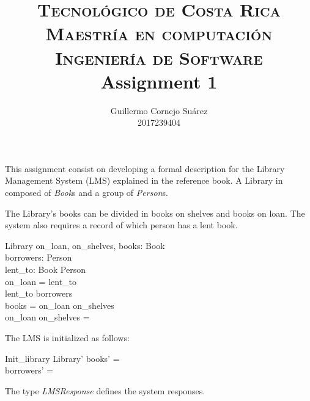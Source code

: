 \documentclass[11pt, fuzz]{article}
\title{		
		\usefont{OT1}{bch}{b}{n}
        \Large \textsc{Tecnológico de Costa Rica} \\
		\normalsize \textsc{Maestría en computación} \\ 
		\normalsize \textsc{Ingeniería de Software} \\ [25pt]		
		\Huge Assignment 1 \\	
}
\author{
		\normalfont \Large   Guillermo Cornejo Suárez \\ 		
        \large		 		 2017239404 \\ 		        
}
\begin{document}
\maketitle

This assignment consist on developing a formal description for the Library Management System (LMS) explained in the reference book. A Library in composed of \emph{Book}s and a group of \emph{Person}s. 


\begin{zed}
\end{zed}

The Library's books can be divided in books on shelves and books on loan. The system also requires a record of which person has a lent book. 


\begin{schema}{Library}
    on\_loan, on\_shelves, books: \power Book \\
    borrowers: \power Person                 \\
    lent\_to: Book \pfun Person              \\
\where
    on\_loan = \dom lent\_to                 \\
    \ran lent\_to \subset borrowers          \\
    books = on\_loan \cup on\_shelves        \\
    on\_loan \cap on\_shelves = \emptyset    
\end{schema}

The LMS is initialized as follows:

\begin{schema}{Init\_library}
    Library'
\where
    books' = \emptyset      \\
    borrowers' = \emptyset
\end{schema}

The type \emph{LMSResponse} defines the system responses. 
\end{document}
